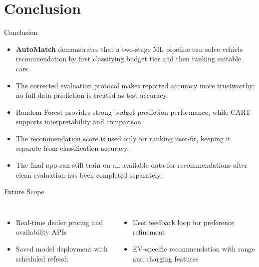 \documentclass[aspectratio=169]{beamer}
\begin{document}
\section{Conclusion}
\begin{frame}{Conclusion}
  \begin{itemize}
    \setlength\itemsep{0.6em}
    \item \textbf{AutoMatch} demonstrates that a two-stage ML pipeline can solve vehicle
          recommendation by first classifying budget tier and then ranking suitable cars.
    \item The corrected evaluation protocol makes reported accuracy more trustworthy:
          no full-data prediction is treated as test accuracy.
    \item Random Forest provides strong budget prediction performance, while CART supports
          interpretability and comparison.
    \item The recommendation score is used only for ranking user-fit, keeping it separate
          from classification accuracy.
    \item The final app can still train on all available data for recommendations after
          clean evaluation has been completed separately.
  \end{itemize}
  \vspace{0.5em}
  \begin{block}{Future Scope}
    \begin{columns}[t]
        \begin{itemize}
          \item Real-time dealer pricing and availability APIs
          \item Saved model deployment with scheduled refresh
        \end{itemize}
        \begin{itemize}
          \item User feedback loop for preference refinement
          \item EV-specific recommendation with range and charging features
        \end{itemize}
    \end{columns}
  \end{block}
\end{frame}

\end{document}
